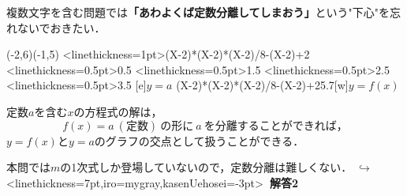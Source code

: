 \documentclass[10pt,
b5paper,
fleqn,
dvipdfmx,
uplatex
]{jsarticle}
\newcommand{\bb}{\bf\boldmath}%
\renewenvironment{leftbar}{%
\def\FrameCommand{\vrule width 1pt \hspace{1zw}}
\MakeFramed{\advance\hsize-\width \FrameRestore}}%
{\endMakeFramed}
\newenvironment{アプローチ}{
\hspace{-2zw}\underbar{\large \bf Approach}\vspace{-1zw}\begin{leftbar}}{\end{leftbar}}
\newcommand{\kaitouii}{{\bb \color{mygray} $\hookrightarrow$}\phkasen<linethickness=7pt,iro=mygray,kasenUehosei=-3pt>{\bf \ 解答2\ }}
\begin{document}
{\begin{アプローチ}
複数文字を含む問題では{\bb 「あわよくば定数分離してしまおう」}という"下心"を忘れないでおきたい．
\begin{tcolorbox}[title={\bb 定数分離},coltitle=black,
enhanced,
frame style={left color=orange!50!white,right color=black!50!orange},
colback=black!0!white,
drop fuzzy shadow
]
\begin{mawarikomi}{}{
\iffigure
\begin{zahyou}[ul=3mm,migiyohaku=2zw](-2,6)(-1,5)
\def\Fx{(X-2)*(X-2)*(X-2)/8-(X-2)+2}
\YGraph<linethickness=1pt>\Fx
\YGraph<linethickness=0.5pt>{0.5}
\YGraph<linethickness=0.5pt>{1.5}
\YGraph<linethickness=0.5pt>{2.5}
\YGraph<linethickness=0.5pt>{3.5}
[e]{$y=a$}
\YPointPut\Fx{5.7}[w]{$y=f(x)$}
\end{zahyou}
\fi
}
定数$a$を含む$x$の方程式の解は，
\[f(x) =a\ (定数)\ の形に\ a\ を分離することができれば，\]
$y=f(x)$と$y=a$のグラフの交点として扱うことができる．
\end{mawarikomi}
\end{tcolorbox}
本問では$m$の1次式しか登場していないので，定数分離は難しくない．\kaitouii
\end{アプローチ}

}
\end{document}

